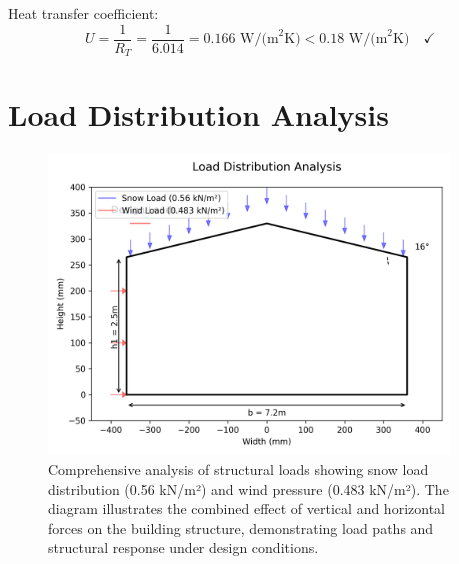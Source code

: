 \documentclass[12pt,a4paper]{article}
\begin{document}
Heat transfer coefficient:
\begin{equation}
U = \frac{1}{R_T} = \frac{1}{6.014} = 0.166 \text{ W/(m}^2\text{K)} < 0.18 \text{ W/(m}^2\text{K)} \quad \checkmark
\end{equation}

\section{Load Distribution Analysis}
\begin{figure}[H]
    \centering
    \includegraphics[width=0.95\textwidth]{cad_project/enhanced_exports/screenshots/load_distribution.png}
    \caption{Comprehensive analysis of structural loads showing snow load distribution (0.56 kN/m²) and wind pressure (0.483 kN/m²).
    The diagram illustrates the combined effect of vertical and horizontal forces on the building structure,
    demonstrating load paths and structural response under design conditions.}
    \label{fig:load_distribution}
\end{figure}
\end{document}
